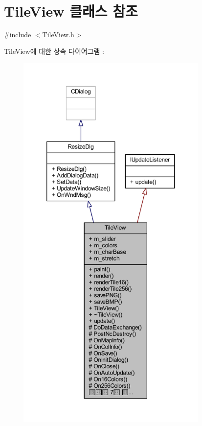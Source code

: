 \hypertarget{class_tile_view}{}\section{Tile\+View 클래스 참조}
\label{class_tile_view}


{\ttfamily \#include $<$Tile\+View.\+h$>$}



Tile\+View에 대한 상속 다이어그램 \+: \nopagebreak
\begin{figure}[H]
\begin{center}
\leavevmode
\includegraphics[height=550pt]{class_tile_view__inherit__graph}
\end{center}
\end{figure}


